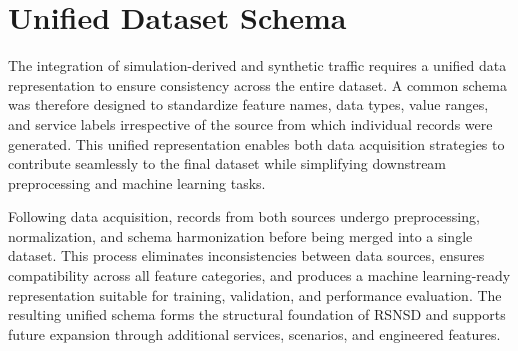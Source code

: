 \documentclass[12pt,a4paper]{report}
\begin{document}
	\section{Unified Dataset Schema}
	\label{sec:schema}
	
	The integration of simulation-derived and synthetic traffic requires a unified data representation to ensure consistency across the entire dataset. A common schema was therefore designed to standardize feature names, data types, value ranges, and service labels irrespective of the source from which individual records were generated. This unified representation enables both data acquisition strategies to contribute seamlessly to the final dataset while simplifying downstream preprocessing and machine learning tasks.
	
	Following data acquisition, records from both sources undergo preprocessing, normalization, and schema harmonization before being merged into a single dataset. This process eliminates inconsistencies between data sources, ensures compatibility across all feature categories, and produces a machine learning-ready representation suitable for training, validation, and performance evaluation. The resulting unified schema forms the structural foundation of RSNSD and supports future expansion through additional services, scenarios, and engineered features.
	
\end{document}
